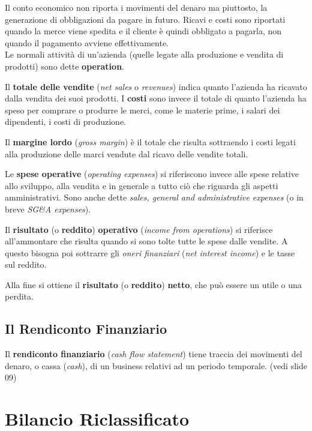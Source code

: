 \documentclass[a4paper,portrait,12pt]{article}
\theoremstyle{definition}
\begin{document}
Il conto economico non riporta i movimenti del denaro ma piuttosto, la generazione di obbligazioni da pagare in futuro.
Ricavi e costi sono riportati quando la merce viene spedita e il cliente è quindi obbligato a pagarla, non quando il pagamento avviene effettivamente.\\

Le normali attività di un'azienda (quelle legate alla produzione e vendita di prodotti) sono dette \textbf{operation}.

Il \textbf{totale delle vendite} (\emph{net sales} o \emph{revenues}) indica quanto l'azienda ha ricavato dalla vendita dei suoi prodotti. 
I \textbf{costi} sono invece il totale di quanto l'azienda ha speso per comprare o produrre le merci, come le materie prime, i salari dei dipendenti, i costi di produzione.

Il \textbf{margine lordo} (\emph{gross margin}) è il totale che risulta sottraendo i costi legati alla produzione delle marci vendute dal ricavo delle vendite totali.

Le \textbf{spese operative} (\emph{operating expenses}) si riferiscono invece alle spese relative allo sviluppo, alla vendita e in generale a tutto ciò che riguarda gli aspetti amministrativi.
Sono anche dette \emph{sales, general and administrative expenses} (o in breve \emph{SG\&A expenses}).

Il \textbf{risultato} (o \textbf{reddito}) \textbf{operativo} (\emph{income from operations}) si riferisce all'ammontare che risulta quando si sono tolte tutte le spese dalle vendite.
A questo bisogna poi sottrarre gli \emph{oneri finanziari} (\emph{net interest income}) e le tasse sul reddito.

Alla fine si ottiene il \textbf{risultato} (o \textbf{reddito}) \textbf{netto}, che può essere un utile o una perdita.


\subsection{Il Rendiconto Finanziario}

Il \textbf{rendiconto finanziario} (\emph{cash flow statement}) tiene traccia dei movimenti del denaro, o cassa (\emph{cash}), di un business relativi ad un periodo temporale.
(vedi slide 09)


\newpage
\section{Bilancio Riclassificato}
\end{document}
